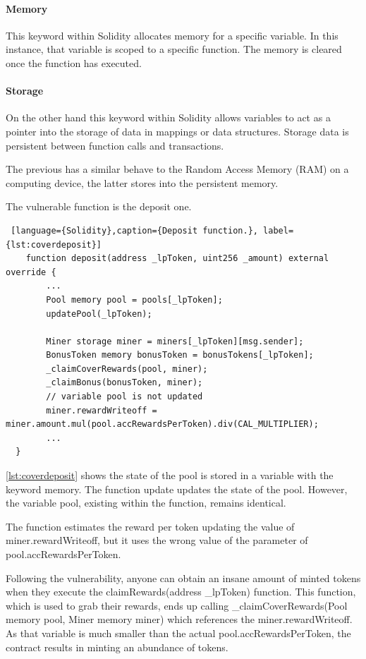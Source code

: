\paragraph{Memory} This keyword within Solidity allocates memory for a specific variable. 
In this instance, that variable is scoped to a specific function. 
The memory is cleared once the function has executed.

\paragraph{Storage} On the other hand this keyword within Solidity allows variables to act as a pointer into the storage of data in mappings or data structures. 
Storage data is persistent between function calls and transactions. 

The previous has a similar behave to the Random Access Memory (RAM) on a computing device, the latter stores into the persistent memory.

The vulnerable function is the deposit one.

\begin{lstlisting} [language={Solidity},caption={Deposit function.}, label={lst:coverdeposit}]
    function deposit(address _lpToken, uint256 _amount) external override {
        ...
        Pool memory pool = pools[_lpToken];
        updatePool(_lpToken);

        Miner storage miner = miners[_lpToken][msg.sender];
        BonusToken memory bonusToken = bonusTokens[_lpToken];
        _claimCoverRewards(pool, miner);
        _claimBonus(bonusToken, miner);
        // variable pool is not updated
        miner.rewardWriteoff = miner.amount.mul(pool.accRewardsPerToken).div(CAL_MULTIPLIER); 
        ...
  }
\end{lstlisting}
\autoref{lst:coverdeposit} shows the state of the pool is stored in a variable with the keyword memory. 
The function update updates the state of the pool. 
However, the variable pool, existing within the function, remains identical. 

The function estimates the reward per token updating the value of miner.rewardWriteoff, 
but it uses the wrong value of the parameter of pool.accRewardsPerToken.

Following the vulnerability, anyone can obtain an insane amount of minted tokens when they execute the claimRewards(address \_lpToken) function. 
This function, which is used to grab their rewards, ends up calling \_claimCoverRewards(Pool memory pool, Miner memory miner) 
which references the miner.rewardWriteoff. 
As that variable is much smaller than the actual pool.accRewardsPerToken, the contract results in minting an abundance of tokens.

